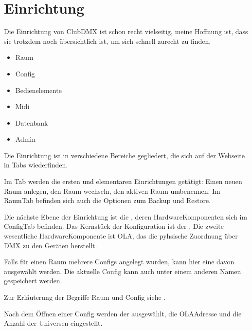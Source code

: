 \documentclass[letterpaper,10pt,ngerman]{sphinxmanual}
\begin{document}
\section{Einrichtung}
\label{\detokenize{navigation:einrichtung}}
Die Einrichtung von ClubDMX ist schon recht vielseitig, meine Hoffnung ist,
dass sie trotzdem noch übersichtlich ist, um sich schnell zurecht zu finden.
\begin{itemize}
\item {} 
Raum

\item {} 
Config

\item {} 
Bedienelemente

\item {} 
Midi

\item {} 
Datenbank

\item {} 
Admin

\end{itemize}

Die Einrichtung ist in verschiedene Bereiche gegliedert, die sich auf der
Webseite in Tabs wiederfinden.

Im \sphinxhyphen{}Tab werden die ersten und elementaren Einrichtungen getätigt:
Einen neuen Raum anlegen, den Raum wechseln, den aktiven Raum umbenennen.
Im Raum\sphinxhyphen{}Tab befinden sich auch die Optionen zum Backup und Restore.

Die nächste Ebene der Einrichtung ist die , deren Hardware\sphinxhyphen{}Komponenten
sich im Config\sphinxhyphen{}Tab befinden. Das
Kernstück der Konfiguration ist der . Die zweite wesentliche
Hardware\sphinxhyphen{}Komponente ist OLA, das die pyhsische Zuordnung über DMX zu den
Geräten herstellt.

Falls  für einen Raum
mehrere Configs angelegt wurden, kann hier eine davon ausgewählt werden. Die
aktuelle Config kann auch unter einem anderen Namen gespeichert werden.

Zur Erläuterung der Begriffe Raum und Config siehe {\hyperref[\detokenize{grundlagen:raum-config-label}]{}} .

Nach dem Öffnen einer Config werden der
{\hyperref[\detokenize{patch:patchlabel}]{}} ausgewählt, die OLA\sphinxhyphen{}Adresse und die Anzahl der Universen
eingestellt.
\end{document}
